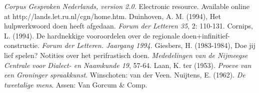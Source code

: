 \documentclass[12pt]{article}
\begin{document}
\begin{thebibliography}{99}
\emph{Corpus Gesproken Nederlands, version 2.0.} Electronic resource. Available online at http://lands.let.ru.nl/cgn/home.htm.
Duinhoven, A. M. (1994), Het hulpwerkwoord doen heeft afgedaan. \emph{Forum der Letteren 35}, 2: 110-131.
Cornips, L. (1994). De hardnekkige vooroordelen over de regionale doen+infinitief-constructie. \emph{Forum der Letteren. Jaargang 1994.}
Giesbers, H. (1983-1984), Doe jij lief spelen? Notities over het perifrastisch doen. \emph{Mededelingen van de Nijmeegse Centrale voor Dialect- en Naamkunde 19}, 57-64.
Laan, K. ter (1953). \emph{Proeve van een Groninger spraakkunst}. Winschoten: van der Veen.
Nuijtens, E. (1962). \emph{De tweetalige mens}. Assen: Van Gorcum \& Comp.
\end{thebibliography}
\end{document}
